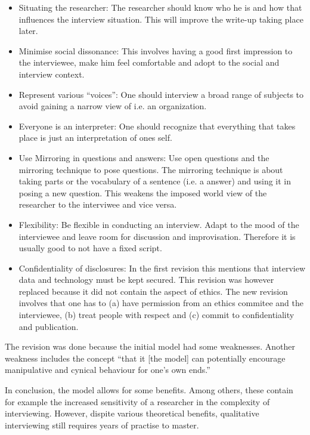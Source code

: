 \documentclass[a4paper,11pt,english]{scrartcl}
\begin{document}
\begin{itemize}[noitemsep,topsep=0pt]
	\item Situating the researcher: The researcher should know who he is and how that influences the interview situation. This will improve the write-up taking place later.
	\item Minimise social dissonance: This involves having a good first impression to the interviewee, make him feel comfortable and adopt to the social and interview context.
	\item Represent various \enquote{voices}: One should interview a broad range of subjects to avoid gaining a narrow view of i.e. an organization.
	\item Everyone is an interpreter: One should recognize that everything that takes place is just an interpretation of ones self.
	\item Use Mirroring in questions and answers: Use open questions and the mirroring technique to pose questions. The mirroring technique is about taking parts or the vocabulary of a sentence (i.e. a answer) and using it in posing a new question. This weakens the imposed world view of the researcher to the interviwee and vice versa.
	\item Flexibility: Be flexible in conducting an interview. Adapt to the mood of the interviewee and leave room for discussion and improvisation. Therefore it is usually good to not have a fixed script.
	\item Confidentiality of disclosures: In the first revision this mentions that interview data and technology must be kept secured. This revision was however replaced because it did not contain the aspect of ethics. The new revision involves that one has to (a) have permission from an ethics commitee and the interviewee, (b) treat people with respect and (c) commit to confidentiality and publication.
\end{itemize}

The revision was done because the initial model had some weaknesses. Another weakness includes the concept \enquote{that it [the model] can potentially encourage manipulative and cynical behaviour for one's own ends.}

In conclusion, the model allows for some benefits. Among others, these contain for example the increased sensitivity of a researcher in the complexity of interviewing. However, dispite various theoretical benefits, qualitative interviewing still requires years of practise to master.
\end{document}
